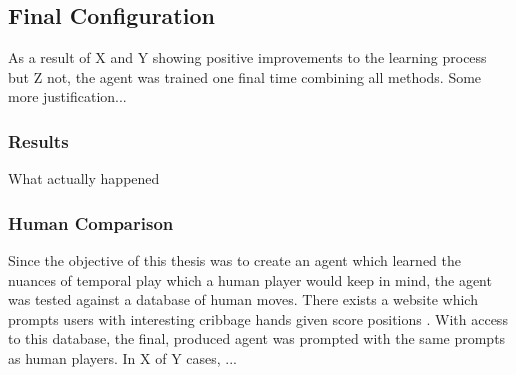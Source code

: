 
\subsection{Final Configuration}
\label{sec:findings-final}

As a result of X and Y showing positive improvements to the learning process
but Z not,
the agent was trained one final time combining all methods.
%
Some more justification...

\subsubsection{Results}

What actually happened

\subsubsection{Human Comparison}

Since the objective of this thesis was to create an agent which learned the
nuances of temporal play which a human player would keep in mind,
the agent was tested against a database of human moves.
%
There exists a website which prompts users with interesting cribbage hands
given score positions
\cite{dailycribbagehand}.
%
With access to this database,
the final, produced agent was prompted with the same prompts as human players.
%
In X of Y cases, ...


